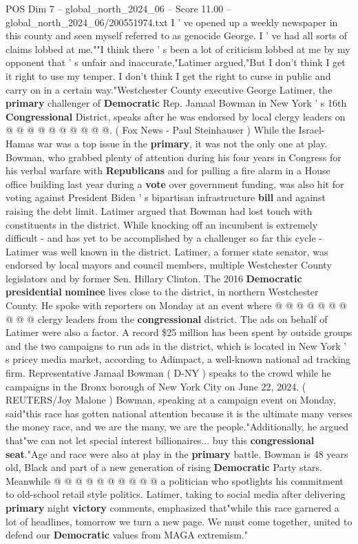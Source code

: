 \begin{textsample}{POS Dim 7 – global\_north\_2024\_06 – Score 11.00 – global\_north\_2024\_06/200551974.txt}
I ' ve opened up a weekly newspaper in this county and seen myself referred to as genocide George.
I ' ve had all sorts of claims lobbed at me.""I think there ' s been a lot of criticism lobbed at me by my opponent that ' s unfair and inaccurate,"Latimer argued,"But I don't think I get it right to use my temper.
I don't think I get the right to curse in public and carry on in a certain way."Westchester County executive George Latimer, the \textbf{primary} challenger of \textbf{Democratic} Rep.
Jamaal Bowman in New York ' s 16th \textbf{Congressional} District, speaks after he was endorsed by local clergy leaders on @ @ @ @ @ @ @ @ @ @. ( Fox News - Paul Steinhauser ) While the Israel-Hamas war was a top issue in the \textbf{primary}, it was not the only one at play.
Bowman, who grabbed plenty of attention during his four years in Congress for his verbal warfare with \textbf{Republicans} and for pulling a fire alarm in a House office building last year during a \textbf{vote} over government funding, was also hit for voting against President Biden ' s bipartisan infrastructure \textbf{bill} and against raising the debt limit.
Latimer argued that Bowman had lost touch with constituents in the district.
While knocking off an incumbent is extremely difficult - and has yet to be accomplished by a challenger so far this cycle - Latimer was well known in the district.
Latimer, a former state senator, was endorsed by local mayors and council members, multiple Westchester County legislators and by former Sen.
Hillary Clinton.
The 2016 \textbf{Democratic} \textbf{presidential} \textbf{nominee} lives close to the district, in northern Westchester County.
He spoke with reporters on Monday at an event where @ @ @ @ @ @ @ @ @ @ clergy leaders from the \textbf{congressional} district.
The ads on behalf of Latimer were also a factor.
A record \$25 million has been spent by outside groups and the two campaigns to run ads in the district, which is located in New York ' s pricey media market, according to Adimpact, a well-known national ad tracking firm.
Representative Jamaal Bowman ( D-NY ) speaks to the crowd while he campaigns in the Bronx borough of New York City on June 22, 2024. ( REUTERS/Joy Malone ) Bowman, speaking at a campaign event on Monday, said"this race has gotten national attention because it is the ultimate many verses the money race, and we are the many, we are the people."Additionally, he argued that"we can not let special interest billionaires... buy this \textbf{congressional} \textbf{seat}."Age and race were also at play in the \textbf{primary} battle.
Bowman is 48 years old, Black and part of a new generation of rising \textbf{Democratic} Party stars.
Meanwhile @ @ @ @ @ @ @ @ @ @ a politician who spotlights his commitment to old-school retail style politics.
Latimer, taking to social media after delivering \textbf{primary} night \textbf{victory} comments, emphasized that"while this race garnered a lot of headlines, tomorrow we turn a new page.
We must come together, united to defend our \textbf{Democratic} values from MAGA extremism."

\end{textsample}

